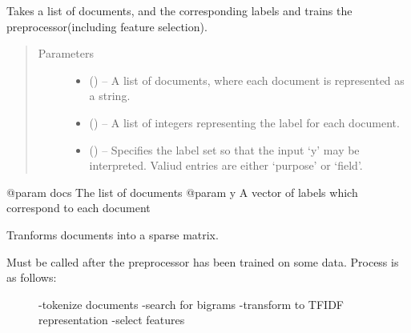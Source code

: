\documentclass[letterpaper,10pt,english]{sphinxmanual}
\begin{document}
\begin{fulllineitems}
\begin{fulllineitems}
\end{fulllineitems}


\begin{fulllineitems}
\label{\detokenize{KUHERD:KUHERD.HerdVectorizer.HerdVectorizer.train}}
Takes a list of documents, and the corresponding labels and trains the preprocessor(including feature selection).
\begin{quote}\begin{description}
\item[{Parameters}] \leavevmode\begin{itemize}
\item {} 
 () -- A list of documents, where each document is represented as a string.

\item {} 
 () -- A list of integers representing the label for each document.

\item {} 
 () -- Specifies the label set so that the input `y' may be interpreted. Valiud entries are either `purpose' or `field'.

\end{itemize}

\end{description}\end{quote}

@param docs The list of documents
@param y A vector of labels which correspond to each document

\end{fulllineitems}


\begin{fulllineitems}
\label{\detokenize{KUHERD:KUHERD.HerdVectorizer.HerdVectorizer.transform_data}}
Tranforms documents into a sparse matrix.
\begin{description}
\item[{Must be called after the preprocessor has been trained on some data. Process is as follows:}] \leavevmode
-tokenize documents
-search for bigrams
-transform to TFIDF representation
-select features


\end{description}
\end{fulllineitems}
\end{fulllineitems}
\end{document}
